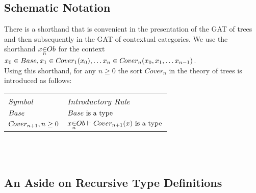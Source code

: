 \subsection {Schematic Notation}
\newcommand{\ft}[1]{
#1 \kern-6pt \raisebox{1.1ex}{$\leftrightline$} \kern-3pt \raisebox{.1ex}{$\downarrow$}}
\newcommand{\bbin}[1]{
\raisebox{-0.5em}{$\stackrel{\displaystyle{\in}} {\scriptstyle{#1}}$}
}
\newcommand{\ofTn}[3]{
#1 \bbin{#2} #3}


\newcommand{\genericOb}{Ob} %



There is a  shorthand that is convenient in the presentation  of the GAT of trees  and then subsequently in the GAT of contextual categories. We use the shorthand
$\ofTn{x}{n}{\genericOb}$ for the context $x_0 \in Base,x_1 \in C\kern-1pt over_{1}(x_0), \hdots x_n \in C\kern-1pt over_{n}(x_0,x_1,\hdots x_{n-1}) $. \\

\noindent Using this shorthand, for any $n \geq 0$ the sort $Cover_{n}$  in the theory of trees is introduced as follows: \\

\vspace{0.03cm} 
\begin{tabular}{>{\itshape}l l}
Symbol & \itshape{Introductory Rule} \\
$Base  $     & $Base\mbox{ is a type}$\\
$C\kern-1pt over_{n+1}, n \geq 0 $ & $\ofTn{x}{n}{\genericOb}    \tstyle \isT{\Si{n+1}(x)} $\\
\end{tabular} \\
\vspace{.1cm}  \\


\subsection {An Aside on Recursive Type Definitions}

